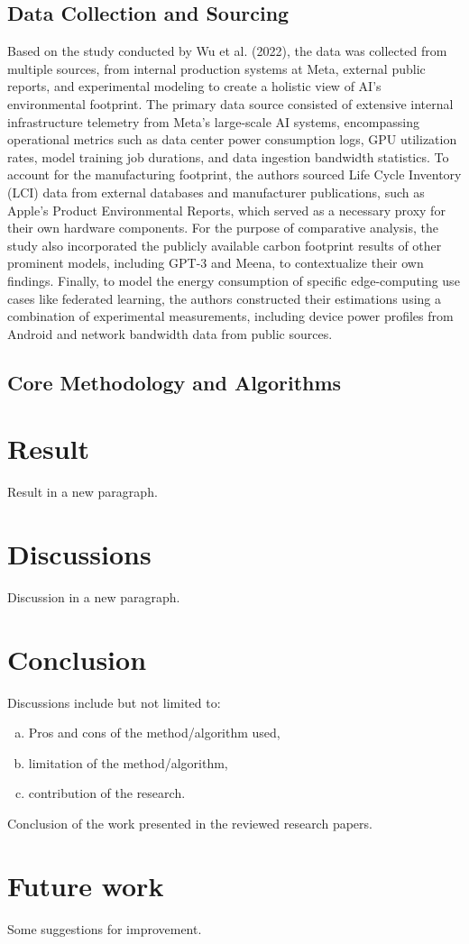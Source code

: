 \documentclass[a4paper, 12pt]{article}
\begin{document}
\subsection{Data Collection and Sourcing}
Based on the study conducted by Wu et al. (2022), the data was collected from multiple sources, from internal production systems at Meta, external public reports, and experimental modeling to create a holistic view of AI's environmental footprint. The primary data source consisted of extensive internal infrastructure telemetry from Meta's large-scale AI systems, encompassing operational metrics such as data center power consumption logs, GPU utilization rates, model training job durations, and data ingestion bandwidth statistics. To account for the manufacturing footprint, the authors sourced Life Cycle Inventory (LCI) data from external databases and manufacturer publications, such as Apple's Product Environmental Reports, which served as a necessary proxy for their own hardware components. For the purpose of comparative analysis, the study also incorporated the publicly available carbon footprint results of other prominent models, including GPT-3 and Meena, to contextualize their own findings. Finally, to model the energy consumption of specific edge-computing use cases like federated learning, the authors constructed their estimations using a combination of experimental measurements, including device power profiles from Android and network bandwidth data from public sources.

\subsection{Core Methodology and Algorithms} 


\section{Result}
Result  in a new paragraph.

\section{Discussions}
Discussion in a new paragraph.

\section{Conclusion}
Discussions include but not limited to:
\begin{enumerate}[(a)]
\item Pros and cons of the method/algorithm used,
\item limitation of the method/algorithm,
\item contribution of the research.
\end{enumerate}
Conclusion of the work presented in the reviewed research papers.

\section{Future work}
Some suggestions for improvement.


{}
\end{document}
